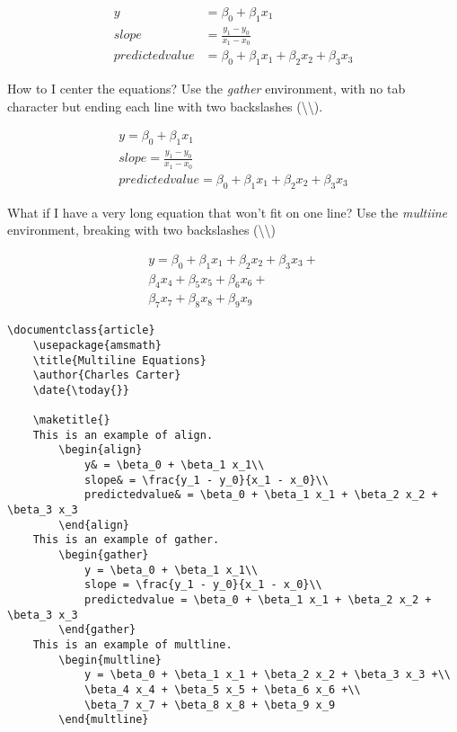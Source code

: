         \begin{sample}
		\begin{align}
			y& = \beta_0 + \beta_1 x_1\\
			slope& = \frac{y_1 - y_0}{x_1 - x_0}\\
			predictedvalue& = \beta_0 + \beta_1 x_1 + \beta_2 x_2 + \beta_3 x_3
		\end{align}

		How to I center the equations? Use the \textit{gather} environment, with no tab character but ending each line with two backslashes (\textbackslash{}\textbackslash{}).

		\begin{gather}
			y = \beta_0 + \beta_1 x_1\\
			slope = \frac{y_1 - y_0}{x_1 - x_0}\\
			predictedvalue = \beta_0 + \beta_1 x_1 + \beta_2 x_2 + \beta_3 x_3
		\end{gather}

		What if I have a very long equation that won't fit on one line? Use the \textit{multiine} environment, breaking with two backslashes (\textbackslash{}\textbackslash{})

		\begin{multline}
			y = \beta_0 + \beta_1 x_1 + \beta_2 x_2 + \beta_3 x_3 +\\
			\beta_4 x_4 + \beta_5 x_5 + \beta_6 x_6 +\\
			\beta_7 x_7 + \beta_8 x_8 + \beta_9 x_9
		\end{multline}
        \end{sample}
		
		\begin{verbatim}
\documentclass{article}
	\usepackage{amsmath}
    \title{Multiline Equations}
    \author{Charles Carter}
    \date{\today{}}
 
    \maketitle{}
	This is an example of align.
		\begin{align}
			y& = \beta_0 + \beta_1 x_1\\
			slope& = \frac{y_1 - y_0}{x_1 - x_0}\\
			predictedvalue& = \beta_0 + \beta_1 x_1 + \beta_2 x_2 + \beta_3 x_3
		\end{align}
	This is an example of gather.
		\begin{gather}
			y = \beta_0 + \beta_1 x_1\\
			slope = \frac{y_1 - y_0}{x_1 - x_0}\\
			predictedvalue = \beta_0 + \beta_1 x_1 + \beta_2 x_2 + \beta_3 x_3
		\end{gather}
	This is an example of multline.
		\begin{multline}
			y = \beta_0 + \beta_1 x_1 + \beta_2 x_2 + \beta_3 x_3 +\\
			\beta_4 x_4 + \beta_5 x_5 + \beta_6 x_6 +\\
			\beta_7 x_7 + \beta_8 x_8 + \beta_9 x_9
		\end{multline}
	    
        \end{verbatim}

